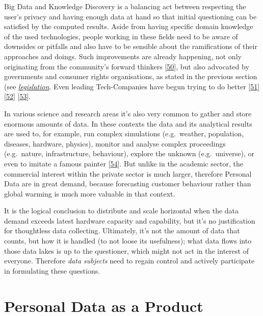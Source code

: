\documentclass[12pt,english,a4paper,titlepage,cleardoublepage=empty,dottedtoc]{report}
\begin{document}
Big Data and Knowledge Discovery is a balancing act between respecting
the user's privacy and having enough data at hand so that initial
questioning can be satisfied by the computed results. Aside from having
specific domain knowledge of the used technologies, people working in
these fields need to be aware of downsides or pitfalls and also have to
be sensible about the ramifications of their approaches and doings. Such
improvements are already happening, not only originating from the
community's forward thinkers
{[}\protect\hyperlink{ref-web_2016_the-state-of-big-data}{50}{]}, but
also advocated by governments and consumer rights organisations, as
stated in the previous section (see
\emph{\protect\hyperlink{digital-identity-personal-data-and-ownership}{legislation}}.
Even leading Tech-Companies have begun trying to do better
{[}\protect\hyperlink{ref-web_2016_apple_customer-letter}{51}{]}
{[}\protect\hyperlink{ref-web_2016_what-is-differential-privacy}{52}{]}
{[}\protect\hyperlink{ref-web_2016_eff_whatsapp-rolls-out-emd-to-end-encryption}{53}{]}.

In various science and research areas it's also very common to gather
and store enormous amounts of data. In these contexts the data and its
analytical results are used to, for example, run complex simulations
(e.g.~weather, population, diseases, hardware, physics), monitor and
analyse complex proceedings (e.g.~nature, infrastructure, behaviour),
explore the unknown (e.g.~universe), or even to imitate a famous painter
{[}\protect\hyperlink{ref-web_2016_research-experiment_ai-rembrandt}{54}{]}.
But unlike in the academic sector, the commercial interest within the
private sector is much larger, therefore Personal Data are in great
demand, because forecasting customer behaviour rather than global
warming is much more valuable in that context.

It is the logical conclusion to distribute and scale horizontal when the
data demand exceeds latest hardware capacity and capability, but it's no
justification for thoughtless data collecting. Ultimately, it's not the
amount of data that counts, but how it is handled (to not loose its
usefulness); what data flows into those data lakes is up to the
questioner, which might not act in the interest of everyone. Therefore
\emph{data subjects} need to regain control and actively participate in
formulating these questions.

\hypertarget{personal-data-as-a-product}{\section{Personal Data as a
Product}\label{personal-data-as-a-product}}
\end{document}
